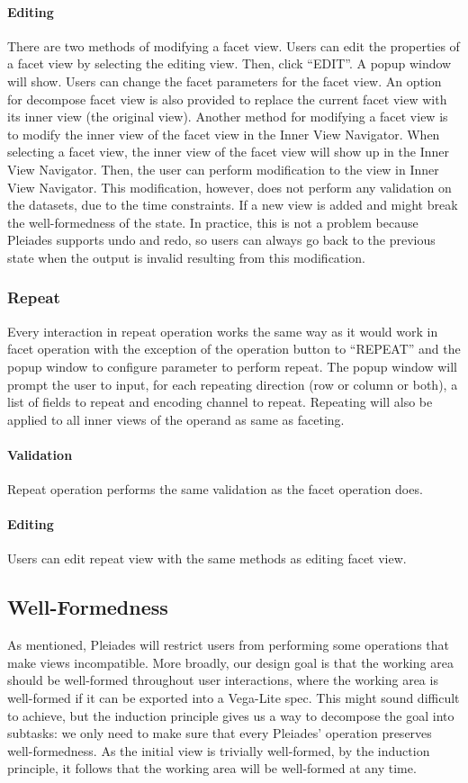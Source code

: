 \documentclass[journal]{vgtc}                %
\begin{document}
\paragraph{Editing} There are two methods of modifying a facet view. Users can
edit the properties of a facet view by selecting the editing view. Then, click
“EDIT”. A popup window will show. Users can change the facet parameters for the
facet view. An option for decompose facet view is also provided to replace the
current facet view with its inner view (the original view). Another method for
modifying a facet view is to modify the inner view of the facet view in the Inner
View Navigator. When selecting a facet view, the inner view of the facet view will
show up in the Inner View Navigator. Then, the user can perform modification to the
view in Inner View Navigator. This modification, however, does not perform any
validation on the datasets, due to the time constraints. If a new view is added
and might break the well-formedness of the state. In practice, this is not a problem
because Pleiades supports undo and redo, so users can always go back to the previous
state when the output is invalid resulting from this modification.

\subsubsection{Repeat}
Every interaction in repeat operation works the same way as it would work in
facet operation with the exception of the operation button to “REPEAT” and the
popup window to configure parameter to perform repeat. The popup window will prompt
the user to input, for each repeating direction (row or column or both), a list of
fields to repeat and encoding channel to repeat. Repeating will also be applied to
all inner views of the operand as same as faceting.

\paragraph{Validation} Repeat operation performs the same validation as the facet
operation does.

\paragraph{Editing} Users can edit repeat view with the same methods as editing facet view.

\subsection{Well-Formedness}
As mentioned, Pleiades will restrict users from performing some operations that
make views incompatible. More broadly, our design goal is that the working area
should be well-formed throughout user interactions, where the working area is
well-formed if it can be exported into a Vega-Lite spec. This might sound difficult
to achieve, but the induction principle gives us a way to decompose the goal into
subtasks: we only need to make sure that every Pleiades’ operation preserves
well-formedness. As the initial view is trivially well-formed, by the induction
principle, it follows that the working area will be well-formed at any time.
\end{document}
